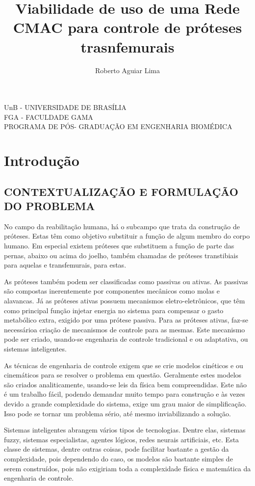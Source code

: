 \documentclass[a4paper, 12pt] {report}
\title{Viabilidade de uso de uma Rede CMAC para controle de pr\'oteses trasnfemurais}
\author{Roberto Aguiar Lima}
\begin{document}
	\begin{center}
		UnB - UNIVERSIDADE DE BRAS\'ILIA\\
		FGA - FACULDADE GAMA\\
		PROGRAMA DE P\'OS- GRADUA\c{C}\~AO EM ENGENHARIA BIOM\'EDICA
	\end{center}
	\maketitle
	
	\chapter{Introdução}
		\section {CONTEXTUALIZAÇÃO E FORMULAÇÃO DO PROBLEMA}

No campo da reabilitação humana, há o subcampo que trata da construção de próteses. Estas têm como objetivo substituir a função de algum membro do corpo humano. Em especial existem próteses que substituem a função de parte das pernas, abaixo ou acima do joelho, também chamadas de próteses transtibiais para aquelas e transfemurais, para estas.

	As próteses também podem ser classificadas como passivas ou ativas. As passivas são compostas inerentemente por componentes mecânicos como molas e alavancas. Já as próteses ativas possuem mecanismos eletro-eletrônicos, que têm como principal função injetar energia no sistema para compensar o gasto metabólico extra, exigido por uma prótese passiva. Para as próteses ativas, faz-se necessárioa criação de mecanismos de controle para as mesmas. Este mecanismo pode ser criado, usando-se engenharia de controle tradicional e ou adaptativa, ou sistemas inteligentes.

	As técnicas de engenharia de controle exigem que se crie modelos cinéticos e ou cinemáticos para se resolver o problema em questão. Geralmente estes modelos são criados analiticamente, usando-se leis da física bem compreendidas. Este não é um trabalho fácil, podendo demandar muito tempo para construção e às vezes devido a grande complexidade do sistema, exige um grau maior de simplificação. Isso pode se tornar um problema sério, até mesmo inviabilizando a solução.

	Sistemas inteligentes abrangem vários tipos de tecnologias. Dentre elas, sistemas fuzzy, sistemas especialistas, agentes lógicos, redes neurais artificiais, etc. Esta classe de sistemas, dentre outras coisas, pode facilitar bastante a gestão da complexidade, pois dependendo do caso, os modelos são bastante simples de serem construídos, pois não exigiriam toda a complexidade física e matemática da engenharia de controle.
\end{document}
